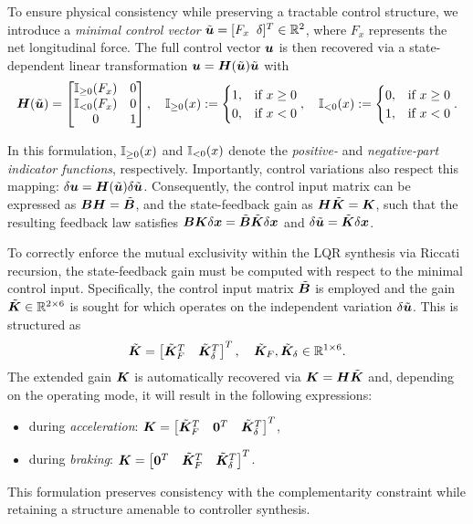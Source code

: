 To ensure physical consistency while preserving a tractable control structure, we introduce a \emph{minimal control vector} \(\tilde{\boldsymbol{u}} = [F_x\;\; \delta]^T \in \mathbb{R}^2\), where \(F_x\) represents the net longitudinal force. The full control vector $\boldsymbol{u}$ is then recovered via a state-dependent linear transformation $
\boldsymbol{u} = \boldsymbol{H}(\tilde{\boldsymbol{u}}) \tilde{\boldsymbol{u}}$ with
\begin{equation} \label{eq:minimalcontrol}
\bH(\tilde{\bu}) =
\begin{bmatrix}
\Ipos{F_x} & 0 \\
\Ineg{F_x} & 0 \\
0 & 1
\end{bmatrix}, \quad
\Ipos{x} :=
\begin{cases}
1, & \text{if } x \geq 0 \\
0, & \text{if } x < 0
\end{cases}, \quad
\Ineg{x} :=
\begin{cases}
0, & \text{if } x \geq 0 \\
1, & \text{if } x < 0
\end{cases}.
\end{equation}

In this formulation, \(\mathbb{I}_{\geq 0}(x)\) and \(\mathbb{I}_{< 0}(x)\) denote the \emph{positive-} and \emph{negative-part indicator functions}, respectively. Importantly, control variations also respect this mapping: $\delta\boldsymbol{u} = \boldsymbol{H}(\tilde{\boldsymbol{u}}) \delta\tilde{\boldsymbol{u}}$. Consequently, the control input matrix can be expressed as \(\boldsymbol{B} \boldsymbol{H} = \tilde{\boldsymbol{B}}\), and the state-feedback gain as \(\boldsymbol{H} \tilde{\boldsymbol{K}} = \boldsymbol{K}\), such that the resulting feedback law satisfies \(\boldsymbol{B} \boldsymbol{K} \delta\boldsymbol{x} = \tilde{\boldsymbol{B}} \tilde{\boldsymbol{K}} \delta\boldsymbol{x}\) and $\delta \tilde{\boldsymbol{u}} = \tilde{\boldsymbol{K}} \delta \boldsymbol{x}$.

To correctly enforce the mutual exclusivity within the LQR synthesis via Riccati recursion, the state-feedback gain must be computed with respect to the minimal control input. Specifically, the control input matrix $\tilde{\boldsymbol{B}}$ is employed and the gain $\tilde{\boldsymbol{K}} \in \mathbb{R}^{2 \times 6}$ is sought for which operates on the independent variation \(\delta\tilde{\boldsymbol{u}}\). This is structured as
\[
\tilde{\boldsymbol{K}} = \begin{bmatrix} \tilde{\boldsymbol{K}}_F^T & \tilde{\boldsymbol{K}}_\delta^T \end{bmatrix}^T, \quad \tilde{\boldsymbol{K}}_F, \tilde{\boldsymbol{K}}_\delta \in \mathbb{R}^{1 \times 6}.
\]
The extended gain $\boldsymbol{K}$ is automatically recovered via $\boldsymbol{K} = \boldsymbol{H} \tilde{\boldsymbol{K}}$ and, depending on the operating mode, it will result in the following expressions:
\begin{itemize}
  \item during \emph{acceleration}: \(\boldsymbol{K} = \begin{bmatrix} \tilde{\boldsymbol{K}}_F^T & \mathbf{0}^T & \tilde{\boldsymbol{K}}_\delta^T \end{bmatrix}^T\),
  \item during \emph{braking}: \(\boldsymbol{K} = \begin{bmatrix} \mathbf{0}^T & \tilde{\boldsymbol{K}}_F^T & \tilde{\boldsymbol{K}}_\delta^T \end{bmatrix}^T\).
\end{itemize}
This formulation preserves consistency with the complementarity constraint while retaining a structure amenable to controller synthesis.

